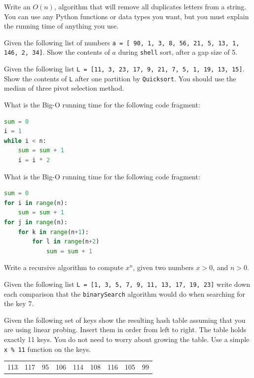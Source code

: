 \documentclass[11pt]{exam}
\begin{document}
\begin{questions}
\newpage
\question[10] 
Write an  $O(n)$, algorithm that will remove all duplicates letters from a string.  You can use any Python functions or data types you want, but you must explain the running time of anything you use.
\vspace{4.5in}



\newpage
\question[10] Given the following list of numbers \texttt{a = [ 90, 1, 3, 8, 56, 21, 5, 13, 1, 146, 2, 34]}.  Show the contents of $a$ during \texttt{shell} sort, after a gap size of 5.
\vspace{4.5in}


\question[10] Given the following list 
\lstinline{L = [11, 3, 23, 17, 9, 21, 7, 5, 1, 19, 13, 15]}.  Show the contents of \lstinline{L} after one partition by \texttt{Quicksort}.  You should use the median of three pivot selection method.
\vspace{4.5in}


\question[5]  What is the Big-O running time for the following code fragment:
\begin{lstlisting}[language=python]
sum = 0
i = 1
while i < n:
    sum = sum + 1
    i = i * 2
\end{lstlisting}
\vspace{.5in}

\question[5]  What is the Big-O running time for the following code fragment:
\begin{lstlisting}[language=python]
sum = 0
for i in range(n):
    sum = sum + 1
for j in range(n):
    for k in range(n+1):
        for l in range(n+2)
            sum = sum + 1
\end{lstlisting}
\vspace{.5in}

\question[10] Write a recursive algorithm to compute $x^n$, given two numbers $x > 0$, and $n > 0$.
\vspace{4.5in}

\question[10] Given the following list \lstinline{L = [1, 3, 5, 7, 9, 11, 13, 17, 19, 23]} write down each comparison that the \texttt{binarySearch} algorithm would do when searching for the key 7.
\vspace{4in}

\question[10] Given the following set of keys show the resulting hash table assuming that you are using linear probing.  Insert them in order from left to right.  The table holds exactly 11 keys.  You do not need to worry about growing the table.  Use a simple \lstinline{x % 11} function on the keys.

\begin{table}[h!]
	\begin{center}
	\begin{tabular}{|c|c|c|c|c|c|c|c|c|}
    113 & 117 & 95 & 106 & 114 & 108 & 116 & 105 & 99 \\
     \end{tabular}
	\end{center}
	\label{htab}
\end{table}
\vspace{3in}


\end{questions}
\end{document}

